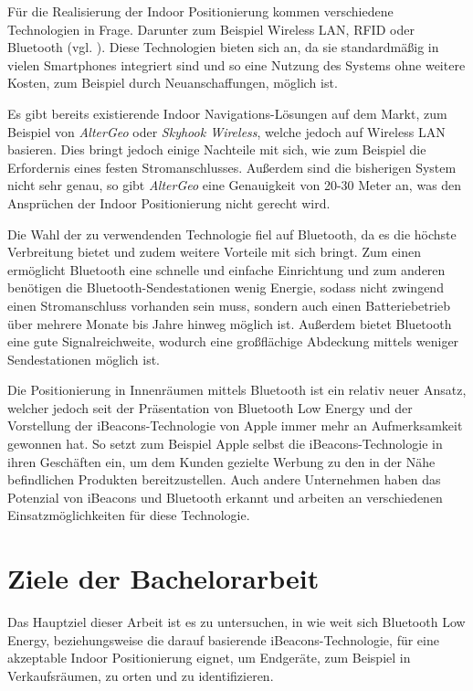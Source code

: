 Für die Realisierung der Indoor Positionierung kommen verschiedene Technologien in Frage. Darunter zum Beispiel Wireless LAN, RFID oder Bluetooth (vgl. \citet{positioningOverview}).
Diese Technologien bieten sich an, da sie standardmäßig in vielen Smartphones integriert sind und so eine Nutzung des Systems ohne weitere Kosten, zum Beispiel durch Neuanschaffungen, möglich ist.

Es gibt bereits existierende Indoor Navigations-Lösungen auf dem Markt, zum Beispiel von \emph{AlterGeo} oder \emph{Skyhook Wireless}, welche jedoch auf Wireless LAN basieren. Dies bringt jedoch einige Nachteile mit sich, wie zum Beispiel die Erfordernis eines festen Stromanschlusses. Außerdem sind die bisherigen System nicht sehr genau, so gibt \emph{AlterGeo} eine Genauigkeit von 20-30 Meter an, was den Ansprüchen der Indoor Positionierung nicht gerecht wird.

Die Wahl der zu verwendenden Technologie fiel auf Bluetooth, da es die höchste Verbreitung bietet und zudem weitere Vorteile mit sich bringt. Zum einen ermöglicht Bluetooth eine schnelle und einfache Einrichtung und zum anderen benötigen die Bluetooth-Sendestationen wenig Energie, sodass nicht zwingend einen Stromanschluss vorhanden sein muss, sondern auch einen Batteriebetrieb über mehrere Monate bis Jahre hinweg möglich ist.
Außerdem bietet Bluetooth eine gute Signalreichweite, wodurch eine großflächige Abdeckung mittels weniger Sendestationen möglich ist.

Die Positionierung in Innenräumen mittels Bluetooth ist ein relativ neuer Ansatz, welcher jedoch seit der Präsentation von Bluetooth Low Energy und der Vorstellung der iBeacons-Technologie von Apple immer mehr an Aufmerksamkeit gewonnen hat. So setzt zum Beispiel Apple selbst die iBeacons-Technologie in ihren Geschäften ein, um dem Kunden gezielte Werbung zu den in der Nähe befindlichen Produkten bereitzustellen. Auch andere Unternehmen haben das Potenzial von iBeacons und Bluetooth erkannt und arbeiten an verschiedenen Einsatzmöglichkeiten für diese Technologie.

\section{Ziele der Bachelorarbeit}
\label{sec:introduction:goal}

Das Hauptziel dieser Arbeit ist es zu untersuchen, in wie weit sich Bluetooth Low Energy, beziehungsweise die darauf basierende iBeacons-Technologie, für eine akzeptable Indoor Positionierung eignet, um Endgeräte, zum Beispiel in Verkaufsräumen, zu orten und zu identifizieren.

